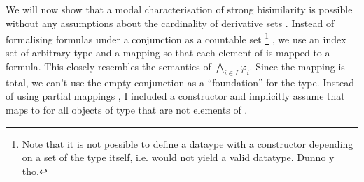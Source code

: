 %
\begin{isabellebody}%
%
%
\isadelimtheory
%
\endisadelimtheory
%
\isatagtheory
%
\endisatagtheory
{\isafoldtheory}%
%
\isadelimtheory
%
\endisadelimtheory
%
\isadelimdocument
%
\endisadelimdocument
%
\isatagdocument
%
\isamarkuptrue%
%
\endisatagdocument
{\isafolddocument}%
%
\isadelimdocument
%
\endisadelimdocument
%
\begin{isamarkuptext}%
\label{chap:HML_arbitrary_conjunction}%
\end{isamarkuptext}\isamarkuptrue%
%
\begin{isamarkuptext}%
We will now show that a modal characterisation of strong bisimilarity is possible without any assumptions about the cardinality of derivative sets . Instead of formalising formulas under a conjunction as a countable set%
\footnote{Note that it is not possible to define a dataype with a constructor depending on a set of the type itself, i.e.\@ {} would not yield a valid datatype. Dunno y tho.}%
, we use an index set of arbitrary type  and a mapping  so that each element of  is mapped to a formula. This closely resembles the semantics of $\bigwedge_{i \in I} \varphi_i$. Since the mapping is total, we can't use the empty conjunction as a \enquote{foundation} for the type. Instead of using partial mappings , I included a constructor  and implicitly assume that  maps to  for all objects of type  that are not elements of .%

\end{isamarkuptext}
\end{isabellebody}
